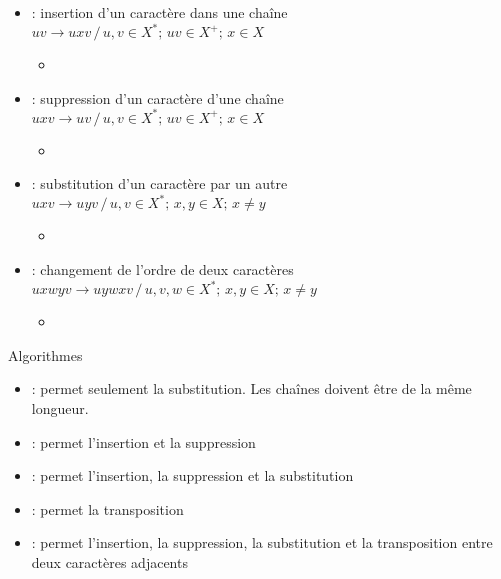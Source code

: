 \documentclass{KodeBook}
\begin{document}
\begin{itemize}
	\item {} : insertion d'un caractère dans une chaîne\\
	$uv \rightarrow uxv \,/\, u, v \in X^*;\, uv \in X^+;\, x \in X$
	\begin{itemize}
		\item {}
	\end{itemize}
	
	\item {} : suppression d'un caractère d'une chaîne\\
	$uxv \rightarrow uv \,/\, u, v \in X^*;\, uv \in X^+;\, x \in X$
	\begin{itemize}
		\item {}
	\end{itemize}
	
	\item {} : substitution d'un caractère par un autre\\
	$uxv \rightarrow uyv \,/\, u, v \in X^*;\, x, y \in X;\, x \ne y$
	\begin{itemize}
		\item {}
	\end{itemize}
	
	\item {} : changement de l'ordre de deux caractères\\
	$uxwyv \rightarrow uywxv \,/\, u, v, w \in X^*;\, x, y \in X;\, x \ne y$
	\begin{itemize}
		\item {}
	\end{itemize}
\end{itemize}

Algorithmes
\begin{itemize}
	\item {} : permet seulement la substitution. Les chaînes doivent être de la même longueur. 
	\item {} : permet l'insertion et la suppression
	\item {} : permet l'insertion, la suppression et la substitution
	\item {} : permet la transposition
	\item {} : permet l'insertion, la suppression, la substitution et la transposition entre deux caractères adjacents
\end{itemize}
\end{document}
